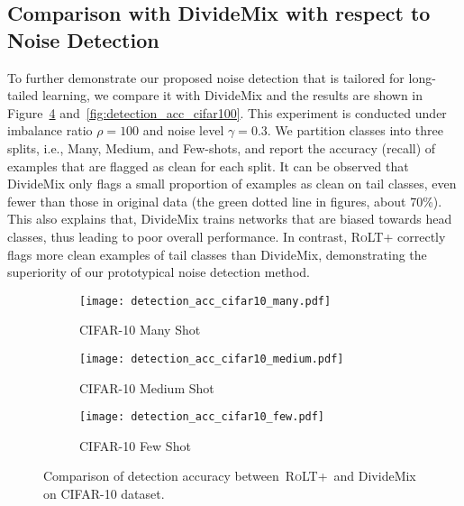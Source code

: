 \documentclass{article}
\def\algo{{\textsc{RoLT}}}
\begin{document}
\subsection{Comparison with DivideMix with respect to Noise Detection}
To further demonstrate our proposed noise detection that is tailored for long-tailed learning, we compare it with DivideMix and the results are shown in Figure~\ref{fig:detection_acc_cifar10} and~\ref{fig:detection_acc_cifar100}. This experiment is conducted under imbalance ratio $\rho=100$ and noise level $\gamma=0.3$. We partition classes into three splits, i.e., Many, Medium, and Few-shots, and report the accuracy (recall) of examples that are flagged as clean for each split. It can be observed that DivideMix only flags a small proportion of examples as clean on tail classes, even fewer than those in original data (the green dotted line in figures, about 70\%). This also explains that, DivideMix trains networks that are biased towards head classes, thus leading to poor overall performance. In contrast, \algo+ correctly flags more clean examples of tail classes than DivideMix, demonstrating the superiority of our prototypical noise detection method.


\begin{figure}[!h]
    \centering
    \begin{subfigure}[b]{0.3\textwidth}
        \centering
        \texttt{[image: detection\_acc\_cifar10\_many.pdf]}
        \caption{CIFAR-10 Many Shot}
        \label{fig:detection_acc_cifar10_many}
    \end{subfigure}
    \begin{subfigure}[b]{0.3\textwidth}
        \centering
        \texttt{[image: detection\_acc\_cifar10\_medium.pdf]} 
        \caption{CIFAR-10 Medium Shot}
        \label{fig:detection_acc_cifar10_medium}
    \end{subfigure}
    \begin{subfigure}[b]{0.3\textwidth}
        \centering
        \texttt{[image: detection\_acc\_cifar10\_few.pdf]} 
        \caption{CIFAR-10 Few Shot}
        \label{fig:detection_acc_cifar10_few}
    \end{subfigure}
    \caption{Comparison of detection accuracy between~\algo+~and DivideMix on CIFAR-10 dataset.}
    \label{fig:detection_acc_cifar10}
\end{figure}
\end{document}

